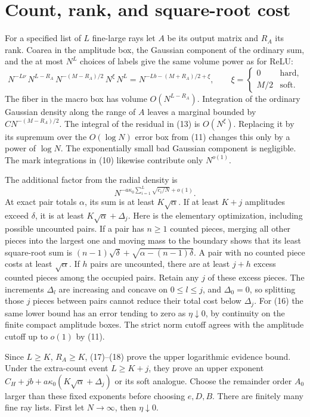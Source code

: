 \documentclass[11pt]{article}
\begin{document}
\section{Count, rank, and square-root cost}
For a specified list of $L$ fine-large rays let $A$ be its output matrix
and $R_A$ its rank. Coarea in the amplitude box, the Gaussian component
of the ordinary sum, and the at most $N^L$ choices of labels give the
same volume power as for ReLU:
\[
 N^{-L\nu}\,N^{L-R_A}\,N^{-(M-R_A)/2}\,N^\xi\,N^L
       =N^{-Lb-(M+R_A)/2+\xi},\qquad
 \xi=\begin{cases}0&\text{hard},\\M/2&\text{soft}.\end{cases} \tag{17}
\]
The fiber in the macro box has volume $O(N^{L-R_A})$. Integration of
the ordinary Gaussian density along the range of $A$ leaves a marginal
bounded by $CN^{-(M-R_A)/2}$. The integral of the residual in (13) is
$O(N^\xi)$. Replacing it by its supremum over the $O(\log N)$ error
box from (11) changes this only by a power of $\log N$. The exponentially
small bad Gaussian component is negligible. The mark integrations in
(10) likewise contribute only $N^{o(1)}$.

The additional factor from the radial density is
\[
       N^{-a\kappa_0\sum_{i=1}^L\sqrt{c_i/N}+o(1)}.    \tag{18}
\]
At exact pair totals $\alpha$, its sum is at least $K\sqrt\alpha$.
If at least $K+j$ amplitudes exceed $\delta$, it is at least
$K\sqrt\alpha+\Delta_j$. Here is the elementary optimization, including
possible uncounted pairs. If a pair has $n\ge1$ counted pieces, merging
all other pieces into the largest one and moving mass to the boundary
shows that its least square-root sum is
$(n-1)\sqrt\delta+\sqrt{\alpha-(n-1)\delta}$.
A pair with no counted piece costs at least $\sqrt\alpha$.
If $h$ pairs are uncounted, there are at least $j+h$ excess counted
pieces among the occupied pairs. Retain any $j$ of these excess pieces.
The increments $\Delta_l$ are increasing and concave on $0\le l\le j$,
and $\Delta_0=0$, so splitting those $j$ pieces between pairs cannot
reduce their total cost below $\Delta_j$.
For (16) the same lower bound has an error tending to zero as
$\eta\downarrow0$, by continuity on the finite compact amplitude boxes.
The strict norm cutoff agrees with the amplitude cutoff up to $o(1)$
by (11).

Since $L\ge K$, $R_A\ge K$, (17)--(18) prove the upper logarithmic
evidence bound. Under the extra-count event $L\ge K+j$, they prove
an upper exponent $C_H+jb+a\kappa_0(K\sqrt\alpha+\Delta_j)$ or its
soft analogue. Choose the remainder order $A_0$ larger than these
fixed exponents before choosing $e,D,B$. There are finitely many fine
ray lists. First let $N\to\infty$, then $\eta\downarrow0$.
\end{document}

